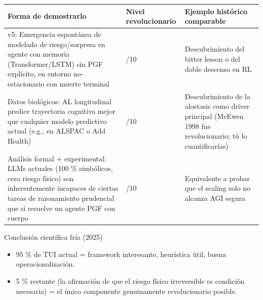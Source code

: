 {\def\LTcaptype{none} %
\begin{longtable}[]{@{}
  >{\raggedright\arraybackslash}p{}
  >{\raggedright\arraybackslash}p{}
  >{\raggedright\arraybackslash}p{}@{}}
\toprule\noalign{}
\begin{minipage}[b]{\linewidth}\raggedright
\textbf{Forma de demostrarlo}
\end{minipage} & \begin{minipage}[b]{\linewidth}\raggedright
\textbf{Nivel revolucionario}
\end{minipage} & \begin{minipage}[b]{\linewidth}\raggedright
\textbf{Ejemplo histórico comparable}
\end{minipage} \\
\midrule\noalign{}
\endhead
\bottomrule\noalign{}
\endlastfoot
v5: Emergencia espontánea de modelado de riesgo/sorpresa en agente con
memoria (Transformer/LSTM) sin PGF explícito, en entorno no-estacionario
con muerte terminal & 8/10 & Descubrimiento del bitter lesson o del
doble descenso en RL \\
Datos biológicos: AL longitudinal predice trayectoria cognitiva mejor
que cualquier modelo predictivo actual (e.g., en ALSPAC o Add Health) &
9/10 & Descubrimiento de la alostasis como driver principal (McEwen 1998
fue revolucionario; tú lo cuantificarías) \\
Análisis formal + experimental: LLMs actuales (100 \% simbólicos,
cero riesgo físico) son inherentemente incapaces de ciertas tareas de
razonamiento prudencial que sí resuelve un agente PGF con cuerpo &
9.5/10 & Equivalente a probar que el scaling solo no alcanza AGI
segura \\
\end{longtable}
}

Conclusión científica fría (2025)

\begin{itemize}
\item
  95 \% de TUI actual = framework interesante, heurística útil, buena
  operacionalización.
\item
  5 \% restante (la afirmación de que el riesgo físico irreversible es
  condición necesaria) = el único componente genuinamente revolucionario
  posible.
\end{itemize}


